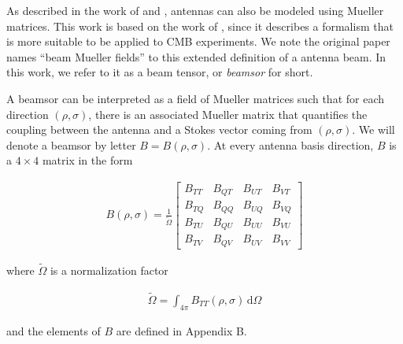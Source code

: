 \documentclass[a4paper,fleqn]{cas-dc}\sloppy
\begin{document}
	\noindent
	As described in the work of \cite{piepmeier_long_njoku_2008} and \cite{2007MNRAS.376.1767O}, antennas can also be modeled using Mueller matrices. This work is based on the work of \cite{2007MNRAS.376.1767O}, since it describes a formalism that is more suitable to be applied to CMB experiments. We note the original paper names ``beam Mueller fields'' to this extended definition of a antenna beam. In this work, we refer to it as a beam tensor, or \textsl{beamsor} for short.
	
	A beamsor can be interpreted as a field of Mueller matrices such that for each direction $(\rho,\sigma)$, there is an associated Mueller matrix that quantifies the coupling between the antenna and a Stokes vector coming from $(\rho,\sigma)$. We will denote a beamsor by letter $B = B(\rho,\sigma)$. At every antenna basis direction, $B$ is a $4\times4$ matrix in the form
	
	\begin{equation}
	\begin{aligned}
	B(\rho,\sigma) = \frac{1}{\tilde{\Omega}}
	\begin{bmatrix}
	B_{TT} & B_{QT} & B_{UT} & B_{VT}\\
	B_{TQ} & B_{QQ} & B_{UQ} & B_{VQ}\\
	B_{TU} & B_{QU} & B_{UU} & B_{VU}\\
	B_{TV} & B_{QV} & B_{UV} & B_{VV}
	\end{bmatrix}
	\end{aligned}
	\label{eq::beamsor}
	\end{equation}
	
	\noindent
	where $\tilde{\Omega}$ is a normalization factor
	
	\begin{equation}
	\begin{aligned}
	\tilde{\Omega} = \int_{4\pi} B_{TT}(\rho,\sigma) \, \mathrm{d} \Omega
	\end{aligned}
	\end{equation}
	
	\noindent
	and the elements of $B$ are defined in Appendix B. 
	
\end{document}
